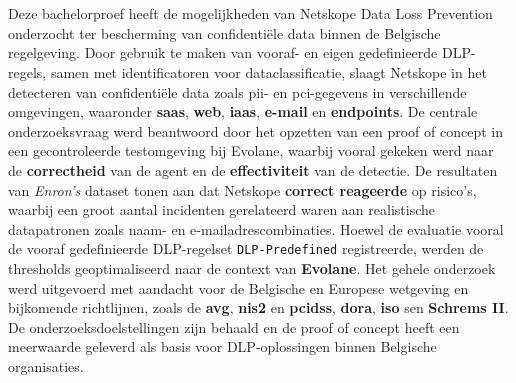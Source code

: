 
\chapter{}%
\label{ch:conclusie}




Deze bachelorproef heeft de mogelijkheden van Netskope Data Loss Prevention onderzocht ter bescherming van confidentiële data binnen de Belgische regelgeving.
Door gebruik te maken van vooraf- en eigen gedefinieerde DLP-regels, samen met identificatoren voor dataclassificatie, 
slaagt Netskope in het detecteren van confidentiële data zoals \gls{pii}- en \gls{pci}-gegevens in verschillende omgevingen, waaronder \textbf{\gls{saas}}, \textbf{web}, \textbf{\gls{iaas}}, \textbf{e-mail} en \textbf{endpoints}.
De centrale onderzoeksvraag werd beantwoord door het opzetten van een proof of concept in een gecontroleerde testomgeving bij Evolane,
waarbij vooral gekeken werd naar de \textbf{correctheid} van de agent en de \textbf{effectiviteit} van de detectie.
De resultaten van \textit{Enron's} dataset tonen aan dat Netskope \textbf{correct reageerde} op risico’s, waarbij een groot aantal incidenten gerelateerd waren aan realistische datapatronen zoals naam- en e-mailadrescombinaties.
Hoewel de evaluatie vooral de vooraf gedefinieerde DLP-regelset \texttt{DLP-Predefined} registreerde, werden de thresholds geoptimaliseerd naar de context van \textbf{Evolane}.
Het gehele onderzoek werd uitgevoerd met aandacht voor de Belgische en Europese wetgeving en bijkomende richtlijnen, zoals de \textbf{\gls{avg}}, \textbf{\gls{nis2}} en \textbf{\gls{pcidss}}, \textbf{\gls{dora}}, \textbf{\gls{iso}} sen \textbf{Schrems II}.
De onderzoeksdoelstellingen zijn behaald en de proof of concept heeft een meerwaarde geleverd als basis voor DLP-oplossingen binnen Belgische organisaties.



